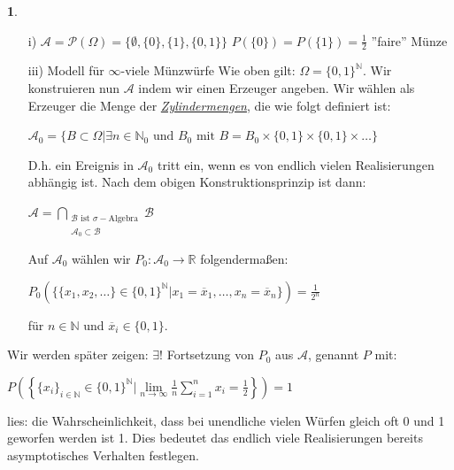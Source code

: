 \documentclass[10pt,a4paper]{report}
\numberwithin{equation}{section}
\numberwithin{figure}{section}
\theoremstyle{plain}
\theoremstyle{definition}
\newtheorem{example}[thm]{\protect\examplename}
\theoremstyle{remark}
\theoremstyle{plain}
\providecommand{\examplename}{Beispiel}
\newcommand{\1}{ \mathbb{1} } %
\begin{document}
\begin{example} \ %
  \begin{itemize}
  \item[i)]
    $\mathcal{A}=\mathcal{P}(\Omega)=\{\emptyset,\{0\},\{1\},\{0,1\}\}$
    \qquad $P(\{0\})=P(\{1\})=\frac{1}{2}$ \qquad ''faire'' Münze
  \item[iii)] Modell für $\infty$-viele Münzwürfe
    Wie oben gilt: $\Omega=\{0,1\}^\mathbb{N}$. Wir konstruieren nun $\mathcal{A}$ indem wir einen Erzeuger angeben. Wir wählen als Erzeuger die Menge der \textit{\underline{Zylindermengen}}, die wie folgt definiert ist:
    \begin{center}
      $\mathcal{A}_0=\{B\subset \Omega|\exists n \in \mathbb{N}_0 \text{ und } B_0 \text{ mit } B=B_0\times\{0,1\}\times \{0,1\}\times\dots \} $
    \end{center}
    D.h. ein Ereignis in $\mathcal{A}_0$ tritt ein, wenn es von endlich vielen Realisierungen abhängig ist. Nach dem obigen Konstruktionsprinzip ist dann:
    \begin{center}
      $\mathcal{A}=\bigcap\limits_{\substack{\mathcal{B} \text{ ist }  \sigma-\text{Algebra}\\ \mathcal{A}_0\subset \mathcal{B}}}\mathcal{B}$
    \end{center}       
    Auf $\mathcal{A}_0$ wählen wir $P_0: \mathcal{A}_0 \to \mathbb{R}$ folgendermaßen:
    \begin{center}
      $P_0(\{\{x_1,x_2,\dots\}\in \{0,1\}^\mathbb{N}|x_1=\overline{x}_1,\dots,x_n=\overline{x}_n\})=\frac{1}{2^n}$
    \end{center}
    für $n \in \mathbb{N}$ und $\overline{x}_i \in \{0,1\}$.
  \end{itemize}
\end{example}
Wir werden später zeigen: $\exists !$ Fortsetzung von $P_0$ aus $\mathcal{A}$, genannt $P$ mit:
\begin{center}
  $P\left(\left\{\{x_i\}_{i \in \mathbb{N}} \in \{0,1\}^\mathbb{N}| \lim\limits_{n \to \infty} \frac{1}{n}\sum\limits_{i=1}^n x_i=\frac{1}{2}\right\}\right)=1$
\end{center}
lies: die Wahrscheinlichkeit, dass bei unendliche vielen Würfen gleich oft 0 und 1 geworfen werden ist 1. Dies bedeutet das endlich viele Realisierungen bereits asymptotisches Verhalten festlegen.
\end{document}
